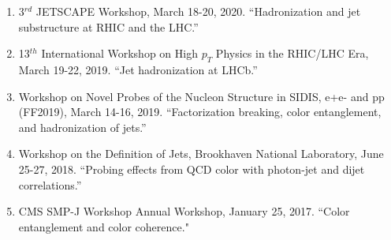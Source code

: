 \documentclass[11pt]{article}
\begin{document}
\begin{flushleft}
\begin{enumerate}
		\item 3$^{rd}$ JETSCAPE Workshop, March 18-20, 2020. ``Hadronization and jet substructure at RHIC and the LHC.''
		\item 13$^{th}$ International Workshop on High $p_T$ Physics in the RHIC/LHC Era, March 19-22, 2019. ``Jet hadronization at LHCb.''
		\item Workshop on Novel Probes of the Nucleon Structure in SIDIS, e+e- and pp (FF2019), March 14-16, 2019. ``Factorization breaking, color entanglement, and hadronization of jets.''
		\item Workshop on the Definition of Jets, Brookhaven National Laboratory, June 25-27, 2018. ``Probing effects from QCD color with photon-jet and dijet correlations.''
		\item CMS SMP-J Workshop Annual Workshop, January 25, 2017. ``Color entanglement and color coherence."
	\end{enumerate}
\end{flushleft}
\end{document}
